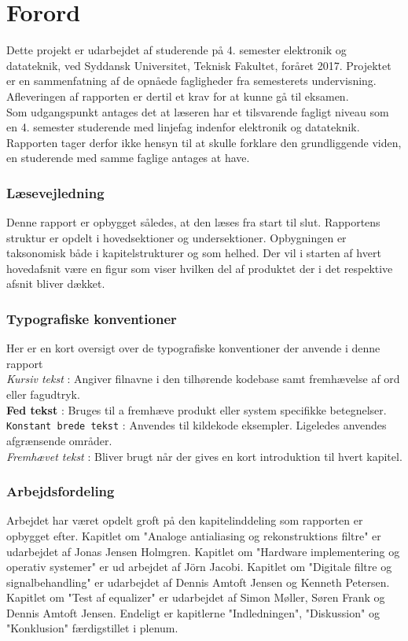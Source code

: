 \chapter*{Forord}\label{chap:forord}

Dette projekt er udarbejdet af studerende på 4. semester elektronik og datateknik, ved Syddansk Universitet, Teknisk Fakultet, foråret 2017. Projektet er en sammenfatning af de opnåede fagligheder fra semesterets undervisning. Afleveringen af rapporten er dertil et krav for at kunne gå til eksamen.\\

Som udgangspunkt antages det at læseren har et tilsvarende fagligt niveau som en 4. semester studerende med linjefag indenfor elektronik og datateknik.
Rapporten tager derfor ikke hensyn til at skulle forklare den grundliggende viden, en studerende med samme faglige antages at have.

\subsection{Læsevejledning}
Denne rapport er opbygget således, at den læses fra start til slut. Rapportens struktur er opdelt i hovedsektioner og undersektioner. Opbygningen er taksonomisk både i kapitelstrukturer og som helhed. Der vil i starten af hvert hovedafsnit være en figur som viser hvilken del af produktet der i det respektive afsnit bliver dækket.

\subsection{Typografiske konventioner}
Her er en kort oversigt over de typografiske konventioner der anvende i denne rapport
\\
\textit{Kursiv tekst} : Angiver filnavne i den tilhørende kodebase samt fremhævelse af ord eller fagudtryk.
\\
\textbf{Fed tekst} : Bruges til a fremhæve produkt eller system specifikke betegnelser.
\\
\texttt{Konstant brede tekst} : Anvendes til kildekode eksempler. Ligeledes anvendes afgrænsende områder. 
\\
\emph{Fremhævet tekst} : Bliver brugt når der gives en kort introduktion til hvert kapitel. 

\subsection{Arbejdsfordeling}
Arbejdet har været opdelt groft på den kapitelinddeling som rapporten er opbygget efter. Kapitlet om "Analoge antialiasing og rekonstruktions filtre" er udarbejdet af Jonas Jensen Holmgren. Kapitlet om "Hardware implementering og operativ systemer" er ud arbejdet af Jörn Jacobi. Kapitlet om "Digitale filtre og signalbehandling" er udarbejdet af Dennis Amtoft Jensen og Kenneth Petersen. Kapitlet om "Test af equalizer" er udarbejdet af Simon Møller, Søren Frank og Dennis Amtoft Jensen. Endeligt er kapitlerne "Indledningen", "Diskussion" og "Konklusion" færdigstillet i plenum.


